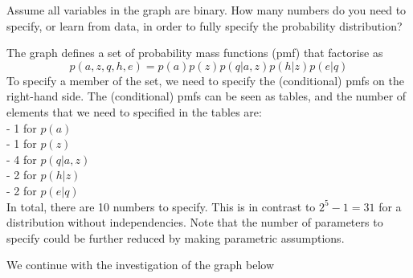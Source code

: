 \begin{exenumerate}
   
  \item Assume all variables in the graph are binary. How many numbers do you need to specify, or learn from data, in order to fully specify the probability distribution?
    \begin{solution}
      The graph defines a set of probability mass functions (pmf) that factorise as
      $$ p(a,z,q,h,e) = p(a) p(z) p(q|a,z) p(h|z) p(e|q)$$
      To specify a member of the set, we need to specify the (conditional) pmfs on the right-hand side. The (conditional) pmfs can be seen as tables, and the number of elements that we need to specified in the tables are:\\
      - 1 for $p(a)$ \\
      - 1 for $p(z)$ \\
      - 4 for $p(q | a,z)$ \\
      - 2 for $p(h | z)$\\
      - 2 for $p(e|q)$ \\
      In total, there are 10 numbers to specify. This is in contrast to $2^5-1 = 31$ for a distribution without independencies.
      Note that the number of parameters to specify could be further reduced by making parametric assumptions. 
      
      \end{solution}
    
  \end{exenumerate}


We continue with the investigation of the graph below

\begin{center}
  \end{center}

